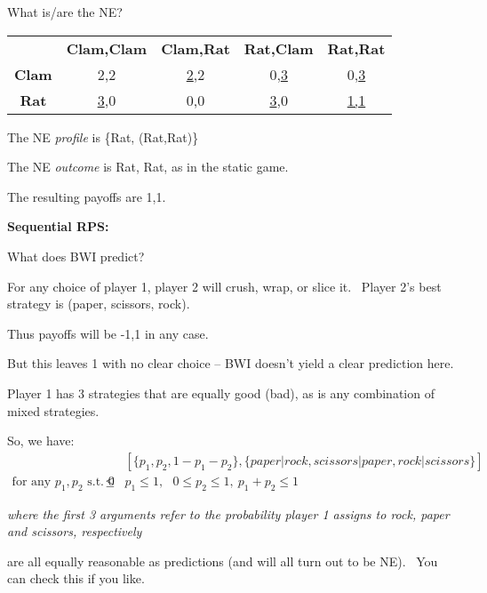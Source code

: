 What is/are the NE?

\begin{tabular}{ccccc}
& \textbf{Clam,Clam} & \textbf{Clam,Rat} & \textbf{Rat,Clam} & \textbf{%
Rat,Rat} \\
\textbf{Clam} & 2,2 & \underline{2},2 & 0,\underline{3} & 0,\underline{3} \\
\textbf{Rat} & \underline{3},0 & 0,0 & \underline{3},0 & \underline{1,1}%
\end{tabular}

The NE \textit{profile} is \{Rat, (Rat,Rat)\}

The NE \textit{outcome} is Rat, Rat, as in the static game.

The resulting payoffs are 1,1.



\textbf{Sequential RPS:}


What does BWI predict?

For any choice of player 1, player 2 will crush, wrap, or slice it. \ Player
2's best strategy is (paper, scissors, rock).


Thus payoffs will be -1,1 in any case. \

But this leaves 1 with no clear choice -- BWI doesn't yield a clear
prediction here.

Player 1 has 3 strategies that are equally good (bad), as is any combination
of mixed strategies.



 So, we have:%
\begin{eqnarray*}
&&[\{p_{1},p_{2},1-p_{1}-p_{2}\},\{paper|rock,scissors|paper,rock|scissors\}]
\\
\text{for any }p_{1},p_{2}\text{ s.t. }0 &\leq &p_{1}\leq 1,\text{ }0\leq
p_{2}\leq 1,~p_{1}+p_{2}\leq 1
\end{eqnarray*}

\textit{where the first 3 arguments refer to the probability player 1
assigns to rock, paper and scissors, respectively}

are all equally reasonable as predictions (and will all turn out to be NE).
\ You can check this if you like.


